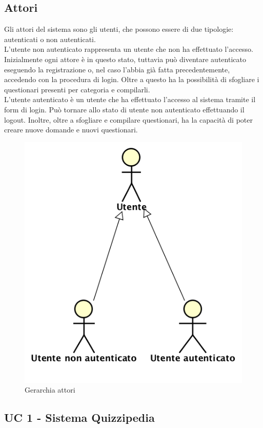 \documentclass[a4paper,11pt]{article}
\begin{document}
\subsection{Attori}
Gli attori del sistema sono gli utenti, che possono essere di due tipologie: autenticati o non autenticati.\\ 
L'utente non autenticato rappresenta un utente che non ha effettuato l'accesso. Inizialmente ogni attore è in questo stato, tuttavia può diventare autenticato eseguendo la registrazione o, nel caso l'abbia già fatta precedentemente, accedendo con la procedura di login. Oltre a questo ha la possibilità di  sfogliare i questionari presenti per categoria e compilarli.\\
L'utente autenticato è un utente che ha effettuato l'accesso al sistema tramite il form di login. Può tornare allo stato di utente non autenticato effettuando il logout. Inoltre, oltre a sfogliare e compilare questionari, ha la capacità di poter creare nuove domande e nuovi questionari.\\

\begin{figure}[h!]
\centering
\includegraphics[scale=1]{../immagini/attori.png}
\caption{Gerarchia attori}
\end{figure}

\newpage
\subsection{UC 1 - Sistema Quizzipedia}
\end{document}
